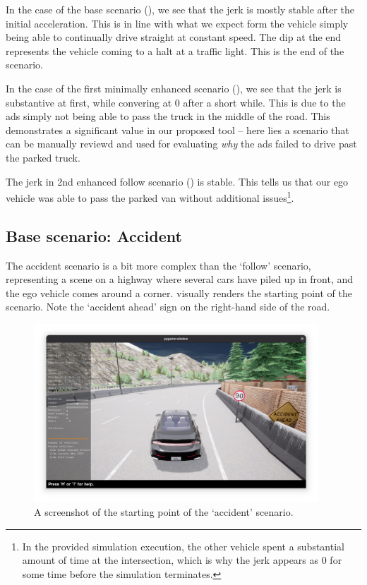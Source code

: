 In the case of the base scenario (), we see that the jerk is mostly stable
after the initial acceleration. This is in line with what we expect form the vehicle simply being
able to continually drive straight at constant speed. The dip at the end represents the vehicle coming to a halt at a traffic light. This is the end of the
scenario.

In the case of the first minimally enhanced scenario (), we
see that the jerk is substantive at first, while convering at \num{0} after a short while. This is
due to the \acrshort{ads} simply not being able to pass the truck in the middle of the road. This
demonstrates a significant value in our proposed tool -- here lies a scenario that can be manually
reviewd and used for evaluating \emph{why} the \acrshort{ads} failed to drive past the parked truck.

The jerk in 2nd enhanced follow scenario () is stable. This
tells us that our ego vehicle was able to pass the parked van without additional issues\footnote{In
    the provided simulation execution, the other vehicle spent a substantial amount of time at the
    intersection, which is why the jerk appears as \num{0} for some time before the simulation
    terminates.}.

\subsection{Base scenario: Accident}\label{sec:resultsAccidentScenario}

The accident scenario is a bit more complex than the `follow' scenario, representing a scene on a
highway where several cars have piled up in front, and the ego vehicle comes around a corner.
 visually renders the starting point of the scenario. Note the
`accident ahead' sign on the right-hand side of the road.

\begin{figure}[htb]
    \centering
    \includegraphics[width=0.95\textwidth]{experiment-material/accident-pics/base/startpoint.png}
    \caption{A screenshot of the starting point of the `accident'
        scenario.}\label{fig:accidentBaseStartPoint}
\end{figure}



